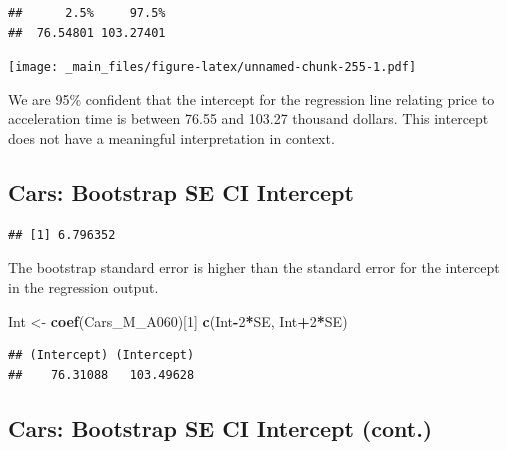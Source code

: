 \documentclass[]{book}
\newenvironment{Shaded}{\begin{snugshade}}{\end{snugshade}}
\newcommand{\KeywordTok}[1]{\textcolor[rgb]{0.13,0.29,0.53}{\textbf{#1}}}
\newcommand{\DecValTok}[1]{\textcolor[rgb]{0.00,0.00,0.81}{#1}}
\newcommand{\StringTok}[1]{\textcolor[rgb]{0.31,0.60,0.02}{#1}}
\newcommand{\OperatorTok}[1]{\textcolor[rgb]{0.81,0.36,0.00}{\textbf{#1}}}
\newcommand{\NormalTok}[1]{#1}
\begin{document}
\begin{verbatim}
##      2.5%     97.5% 
##  76.54801 103.27401
\end{verbatim}

\texttt{[image: \_main\_files/figure-latex/unnamed-chunk-255-1.pdf]}

We are 95\% confident that the intercept for the regression line
relating price to acceleration time is between 76.55 and 103.27 thousand
dollars. This intercept does not have a meaningful interpretation in
context.

\subsection{Cars: Bootstrap SE CI
Intercept}\label{cars-bootstrap-se-ci-intercept}

\begin{Shaded}
\end{Shaded}

\begin{verbatim}
## [1] 6.796352
\end{verbatim}

The bootstrap standard error is higher than the standard error for the
intercept in the regression output.

\begin{Shaded}
\begin{Highlighting}[]
\NormalTok{Int <-}\StringTok{ }\KeywordTok{coef}\NormalTok{(Cars_M_A060)[}\DecValTok{1}\NormalTok{]}
\KeywordTok{c}\NormalTok{(Int}\OperatorTok{-}\DecValTok{2}\OperatorTok{*}\NormalTok{SE, Int}\OperatorTok{+}\DecValTok{2}\OperatorTok{*}\NormalTok{SE)}
\end{Highlighting}
\end{Shaded}

\begin{verbatim}
## (Intercept) (Intercept) 
##    76.31088   103.49628
\end{verbatim}

\subsection{Cars: Bootstrap SE CI Intercept
(cont.)}\label{cars-bootstrap-se-ci-intercept-cont.}
\end{document}
